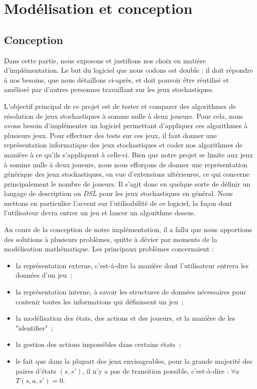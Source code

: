 \documentclass{article}
\begin{document}
\section{Modélisation et conception}

\subsection{Conception}
Dans cette partie, nous exposons et justifions nos choix en matière d'implémentation. Le but du logiciel que nous codons est double : il doit répondre à nos besoins, que nous détaillons ci-après, et doit pouvoir être réutilisé et amélioré par d'autres personnes travaillant sur les jeux stochastiques.

L'objectif principal de ce projet est de tester et comparer des algorithmes de résolution de jeux stochastiques à somme nulle à deux joueurs. Pour cela, nous avons besoin d'implémenter un logiciel permettant d'appliquer ces algorithmes à plusieurs jeux. Pour effectuer des tests sur ces jeux, il faut donner une représentation informatique des jeux stochastiques et coder nos algorithmes de manière à ce qu'ils s'appliquent à celle-ci. Bien que notre projet se limite aux jeux à somme nulle à deux joueurs, nous nous efforçons de donner une représentation générique des jeux stochastiques, en vue d'extensions ultérieures, ce qui concerne principalement le nombre de joueurs. Il s'agit donc en quelque sorte de définir un langage de description ou \textit{DSL} pour les jeux stochastiques en général. Nous mettons en particulier l'accent sur l'utilisabilité de ce logiciel, la façon dont l'utilisateur devra entrer un jeu et lancer un algorithme dessus.

Au cours de la conception de notre implémentation, il a fallu que nous apportions des solutions à plusieurs problèmes, quitte à dévier par moments de la modélisation mathématique. Les principaux problèmes concernaient :
\begin{itemize}
\item la représentation externe, c'est-à-dire la manière dont l'utilisateur entrera les données d'un jeu~;
\item la représentation interne, à savoir les structures de données nécessaires pour contenir toutes les informations qui définissent un jeu~;
\item la modélisation des états, des actions et des joueurs, et la manière de les "identifier"~;
\item la gestion des actions impossibles dans certains états~;
\item le fait que dans la plupart des jeux envisageables, pour la grande majorité des paires d'états \((s, s')\), il n'y a pas de transition possible, c'est-à-dire : \(\forall a\) \(T(s, a, s') = 0\).
\end{itemize}
\end{document}
